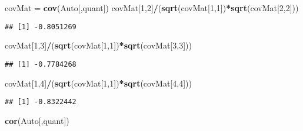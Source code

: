 \documentclass[]{article}
\newenvironment{Shaded}{\begin{snugshade}}{\end{snugshade}}
\newcommand{\DecValTok}[1]{\textcolor[rgb]{0.00,0.00,0.81}{#1}}
\newcommand{\KeywordTok}[1]{\textcolor[rgb]{0.13,0.29,0.53}{\textbf{#1}}}
\newcommand{\NormalTok}[1]{#1}
\newcommand{\OperatorTok}[1]{\textcolor[rgb]{0.81,0.36,0.00}{\textbf{#1}}}
\newcommand{\StringTok}[1]{\textcolor[rgb]{0.31,0.60,0.02}{#1}}
\begin{document}
\begin{Shaded}
\begin{Highlighting}[]
\NormalTok{covMat =}\StringTok{ }\KeywordTok{cov}\NormalTok{(Auto[,quant])}
\NormalTok{covMat[}\DecValTok{1}\NormalTok{,}\DecValTok{2}\NormalTok{]}\OperatorTok{/}\NormalTok{(}\KeywordTok{sqrt}\NormalTok{(covMat[}\DecValTok{1}\NormalTok{,}\DecValTok{1}\NormalTok{])}\OperatorTok{*}\KeywordTok{sqrt}\NormalTok{(covMat[}\DecValTok{2}\NormalTok{,}\DecValTok{2}\NormalTok{]))}
\end{Highlighting}
\end{Shaded}

\begin{verbatim}
## [1] -0.8051269
\end{verbatim}

\begin{Shaded}
\begin{Highlighting}[]
\NormalTok{covMat[}\DecValTok{1}\NormalTok{,}\DecValTok{3}\NormalTok{]}\OperatorTok{/}\NormalTok{(}\KeywordTok{sqrt}\NormalTok{(covMat[}\DecValTok{1}\NormalTok{,}\DecValTok{1}\NormalTok{])}\OperatorTok{*}\KeywordTok{sqrt}\NormalTok{(covMat[}\DecValTok{3}\NormalTok{,}\DecValTok{3}\NormalTok{]))}
\end{Highlighting}
\end{Shaded}

\begin{verbatim}
## [1] -0.7784268
\end{verbatim}

\begin{Shaded}
\begin{Highlighting}[]
\NormalTok{covMat[}\DecValTok{1}\NormalTok{,}\DecValTok{4}\NormalTok{]}\OperatorTok{/}\NormalTok{(}\KeywordTok{sqrt}\NormalTok{(covMat[}\DecValTok{1}\NormalTok{,}\DecValTok{1}\NormalTok{])}\OperatorTok{*}\KeywordTok{sqrt}\NormalTok{(covMat[}\DecValTok{4}\NormalTok{,}\DecValTok{4}\NormalTok{]))}
\end{Highlighting}
\end{Shaded}

\begin{verbatim}
## [1] -0.8322442
\end{verbatim}

\begin{Shaded}
\begin{Highlighting}[]
\KeywordTok{cor}\NormalTok{(Auto[,quant])}
\end{Highlighting}
\end{Shaded}
\end{document}
